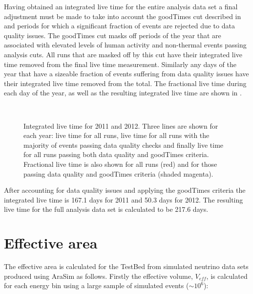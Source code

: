 Having obtained an integrated live time for the entire analysis data set a final adjustment must be made to take into account the goodTimes cut described in  and periods for which a significant fraction of events are rejected due to data quality issues. The goodTimes cut masks off periods of the year that are associated with elevated levels of human activity and non-thermal events passing analysis cuts. All runs that are masked off by this cut have their integrated live time removed from the final live time measurement. Similarly any days of the year that have a sizeable fraction of events suffering from data quality issues have their integrated live time removed from the total. The fractional live time during each day of the year, as well as the resulting integrated live time are shown in . 

\begin{figure}
  \hfill
  \\
  \hfill
  \caption{Integrated live time for 2011 and 2012. Three lines are shown for each year: live time for all runs, live time for all runs with the majority of events passing data quality checks and finally live time for all runs passing both data quality and goodTimes criteria. Fractional live time is also shown for all runs (red) and for those passing data quality and goodTimes criteria (shaded magenta).}
  \label{fig:Results:Integrated-LiveTime}
\end{figure}

After accounting for data quality issues and applying the goodTimes criteria the integrated live time is 167.1 days for 2011 and 50.3 days for 2012. The resulting live time for the full analysis data set is calculated to be 217.6 days.


\section{Effective area}
\label{sec:Results:Effective-Area}

The effective area is calculated for the TestBed from simulated neutrino data sets produced using AraSim as follows. Firstly the effective volume, $V_{eff}$, is calculated for each energy bin using a large sample of simulated events ($\sim 10^{6}$):

